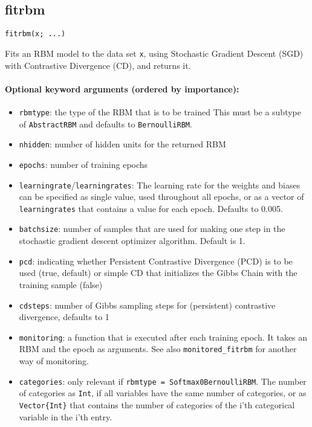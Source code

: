 \subsection*{fitrbm}
\begin{verbatim}
fitrbm(x; ...)
\end{verbatim}
Fits an RBM model to the data set \texttt{x}, using Stochastic Gradient Descent (SGD) with Contrastive Divergence (CD), and returns it.

\paragraph*{Optional keyword arguments (ordered by importance):}
\begin{itemize}
\item \texttt{rbmtype}: the type of the RBM that is to be trained  This must be a subtype of \texttt{AbstractRBM} and defaults to \texttt{BernoulliRBM}.


\item \texttt{nhidden}: number of hidden units for the returned RBM


\item \texttt{epochs}: number of training epochs


\item \texttt{learningrate}/\texttt{learningrates}: The learning rate for the weights and biases  can be specified as single value, used throughout all epochs, or as a vector  of \texttt{learningrates} that contains a value for each epoch. Defaults to 0.005.


\item \texttt{batchsize}: number of samples that are used for making one step in the  stochastic gradient descent optimizer algorithm. Default is 1.


\item \texttt{pcd}: indicating whether Persistent Contrastive Divergence (PCD) is to  be used (true, default) or simple CD that initializes the Gibbs Chain with  the training sample (false)


\item \texttt{cdsteps}: number of Gibbs sampling steps for (persistent)  contrastive divergence, defaults to 1


\item \texttt{monitoring}: a function that is executed after each training epoch.  It takes an RBM and the epoch as arguments.  See also \texttt{monitored\_fitrbm} for another way of monitoring.


\item \texttt{categories}: only relevant if \texttt{rbmtype = Softmax0BernoulliRBM}.  The number of categories as \texttt{Int}, if all variables have the same number  of categories, or as \texttt{Vector\{Int\}} that contains the number of categories  of the i'th categorical variable in the i'th entry.



\end{itemize}
